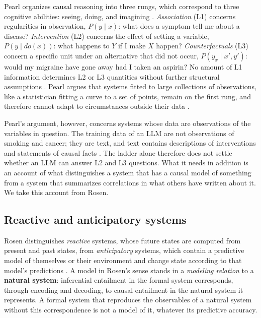 \documentclass{llncs}
\begin{document}
Pearl organizes causal reasoning into three rungs, which correspond to three cognitive abilities: seeing, doing, and imagining \cite{pearl2009causality,pearl2018bookOfWhy}. \emph{Association} (L1) concerns regularities in observation, $P(y \mid x)$: what does a symptom tell me about a disease? \emph{Intervention} (L2) concerns the effect of setting a variable, $P(y \mid do(x))$: what happens to $Y$ if I make $X$ happen? \emph{Counterfactuals} (L3) concern a specific unit under an alternative that did not occur, $P(y_x \mid x', y')$: would my migraine have gone away had I taken an aspirin? No amount of L1 information determines L2 or L3 quantities without further structural assumptions \cite{pearl2018theoretical}. Pearl argues that systems fitted to large collections of observations, like a statistician fitting a curve to a set of points, remain on the first rung, and therefore cannot adapt to circumstances outside their data \cite{pearl2018theoretical,pearl2018bookOfWhy}.

Pearl's argument, however, concerns systems whose data are observations of the variables in question. The training data of an LLM are not observations of smoking and cancer; they are text, and text contains descriptions of interventions and statements of causal facts \cite{Zecevic2023CausalPL}. The ladder alone therefore does not settle whether an LLM can answer L2 and L3 questions. What it needs in addition is an account of what distinguishes a system that has a causal model of something from a system that summarizes correlations in what others have written about it. We take this account from Rosen.

\subsection{Reactive and anticipatory systems}
\label{sec:rosen}

Rosen distinguishes \emph{reactive} systems, whose future states are computed from present and past states, from \emph{anticipatory} systems, which contain a predictive model of themselves or their environment and change state according to that model's predictions \cite{rosen2012anticipatory}. A model in Rosen's sense stands in a \emph{modeling relation} to a \textbf{natural system}: inferential entailment in the formal system corresponds, through encoding and decoding, to causal entailment in the natural system it represents. A formal system that reproduces the observables of a natural system without this correspondence is not a model of it, whatever its predictive accuracy.
\end{document}
